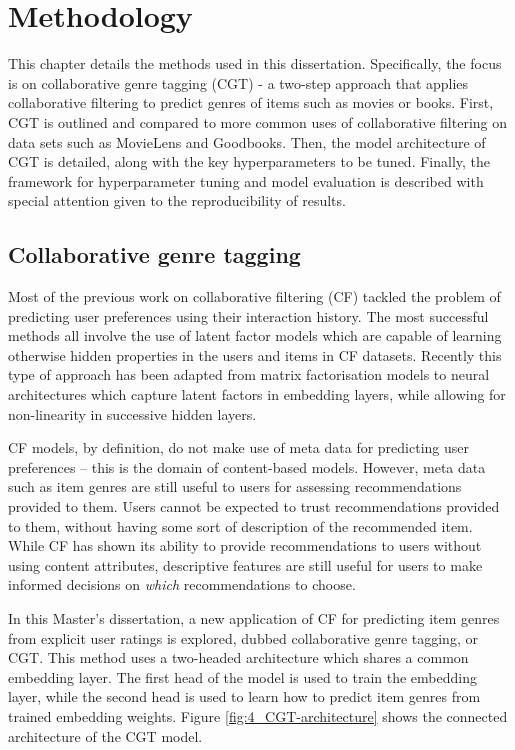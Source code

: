 \chapter{Methodology}
This chapter details the methods used in this dissertation. Specifically, the focus is on collaborative genre tagging (CGT) - a two-step approach that applies collaborative filtering to predict genres of items such as movies or books. First, CGT is outlined and compared to more common uses of collaborative filtering on data sets such as MovieLens and Goodbooks. Then, the model architecture of CGT is detailed, along with the key hyperparameters to be tuned. Finally, the framework for hyperparameter tuning and model evaluation is described with special attention given to the reproducibility of results.

\section{Collaborative genre tagging}
Most of the previous work on collaborative filtering (CF) tackled the problem of predicting user preferences using their interaction history. The most successful methods all involve the use of latent factor models which are capable of learning otherwise hidden properties in the users and items in CF datasets. Recently this type of approach has been adapted from matrix factorisation models to neural architectures which capture latent factors in embedding layers, while allowing for non-linearity in successive hidden layers. 

CF models, by definition, do not make use of meta data for predicting user preferences -- this is the domain of content-based models. However, meta data such as item genres are still useful to users for assessing recommendations provided to them. Users cannot be expected to trust recommendations provided to them, without having some sort of description of the recommended item. While CF has shown its ability to provide recommendations to users without using content attributes, descriptive features are still useful for users to make informed decisions on \textit{which} recommendations to choose.

In this Master's dissertation, a new application of CF for predicting item genres from explicit user ratings is explored, dubbed collaborative genre tagging, or CGT. This method uses a two-headed architecture which shares a common embedding layer. The first head of the model is used to train the embedding layer, while the second head is used to learn how to predict item genres from trained embedding weights. Figure \ref{fig:4_CGT-architecture} shows the connected architecture of the CGT model.

